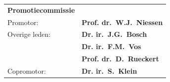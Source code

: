\newpage
\thispagestyle{empty}
\label{othersideformal}

\begin{tabular}{@{}ll@{}}
\large\bf{Promotiecommissie} &\\ [8ex]
Promotor:    & {\bf Prof. dr.~W.J.~Niessen}\\[3ex]
Overige leden: & {\bf Dr. ir.~J.G.~Bosch}\\[1ex]
&{\bf Dr. ir.~F.M.~Vos}\\[1ex]
&{\bf Prof. dr.~D.~Rueckert}\\[3ex]
Copromotor: & {\bf Dr. ir.~S.~Klein}\\[1ex]
\end{tabular}






\setlength{\parindent}{\myindent}



